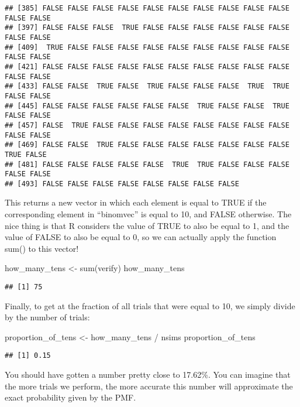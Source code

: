 \documentclass[
]{book}
\newenvironment{Shaded}{\begin{snugshade}}{\end{snugshade}}
\newcommand{\FunctionTok}[1]{\textcolor[rgb]{0.00,0.00,0.00}{#1}}
\newcommand{\NormalTok}[1]{#1}
\newcommand{\OtherTok}[1]{\textcolor[rgb]{0.56,0.35,0.01}{#1}}
\newcommand{\SpecialCharTok}[1]{\textcolor[rgb]{0.00,0.00,0.00}{#1}}
\begin{document}
\begin{verbatim}
## [385] FALSE FALSE FALSE FALSE FALSE FALSE FALSE FALSE FALSE FALSE FALSE FALSE
## [397] FALSE FALSE FALSE  TRUE FALSE FALSE FALSE FALSE FALSE FALSE FALSE FALSE
## [409]  TRUE FALSE FALSE FALSE FALSE FALSE FALSE FALSE FALSE FALSE FALSE FALSE
## [421] FALSE FALSE FALSE FALSE FALSE FALSE FALSE FALSE FALSE FALSE FALSE FALSE
## [433] FALSE FALSE  TRUE FALSE  TRUE FALSE FALSE FALSE  TRUE  TRUE FALSE FALSE
## [445] FALSE FALSE FALSE FALSE FALSE FALSE  TRUE FALSE FALSE  TRUE FALSE FALSE
## [457] FALSE  TRUE FALSE FALSE FALSE FALSE FALSE FALSE FALSE FALSE FALSE FALSE
## [469] FALSE FALSE  TRUE FALSE FALSE FALSE FALSE FALSE FALSE FALSE  TRUE FALSE
## [481] FALSE FALSE FALSE FALSE FALSE  TRUE  TRUE FALSE FALSE FALSE FALSE FALSE
## [493] FALSE FALSE FALSE FALSE FALSE FALSE FALSE FALSE
\end{verbatim}

This returns a new vector in which each element is equal to TRUE if the corresponding element in ``binomvec'' is equal to 10, and FALSE otherwise. The nice thing is that R considers the value of TRUE to also be equal to 1, and the value of FALSE to also be equal to 0, so we can actually apply the function sum() to this vector!

\begin{Shaded}
\begin{Highlighting}[]
\NormalTok{how\_many\_tens }\OtherTok{\textless{}{-}} \FunctionTok{sum}\NormalTok{(verify)}
\NormalTok{how\_many\_tens}
\end{Highlighting}
\end{Shaded}

\begin{verbatim}
## [1] 75
\end{verbatim}

Finally, to get at the fraction of all trials that were equal to 10, we simply divide by the number of trials:

\begin{Shaded}
\begin{Highlighting}[]
\NormalTok{proportion\_of\_tens }\OtherTok{\textless{}{-}}\NormalTok{ how\_many\_tens }\SpecialCharTok{/}\NormalTok{ nsims}
\NormalTok{proportion\_of\_tens}
\end{Highlighting}
\end{Shaded}

\begin{verbatim}
## [1] 0.15
\end{verbatim}

You should have gotten a number pretty close to 17.62\%. You can imagine that the more trials we perform, the more accurate this number will approximate the exact probability given by the PMF.
\end{document}
